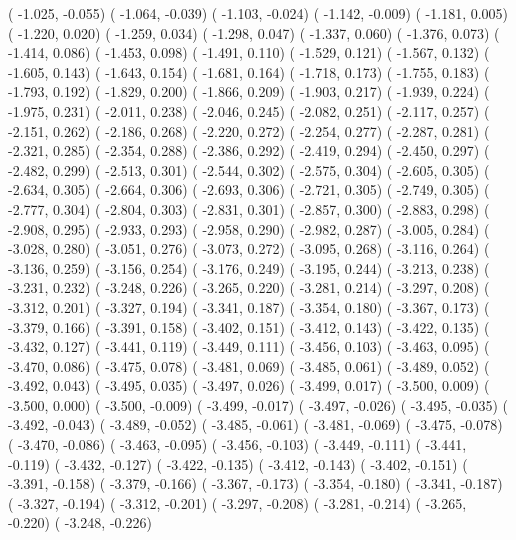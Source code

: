 {  ( -1.025,  -0.055)  ( -1.064,  -0.039)  ( -1.103,  -0.024)  ( -1.142,  -0.009)  ( -1.181,   0.005)
  ( -1.220,   0.020)  ( -1.259,   0.034)  ( -1.298,   0.047)  ( -1.337,   0.060)  ( -1.376,   0.073)
  ( -1.414,   0.086)  ( -1.453,   0.098)  ( -1.491,   0.110)  ( -1.529,   0.121)  ( -1.567,   0.132)
  ( -1.605,   0.143)  ( -1.643,   0.154)  ( -1.681,   0.164)  ( -1.718,   0.173)  ( -1.755,   0.183)
  ( -1.793,   0.192)  ( -1.829,   0.200)  ( -1.866,   0.209)  ( -1.903,   0.217)  ( -1.939,   0.224)
  ( -1.975,   0.231)  ( -2.011,   0.238)  ( -2.046,   0.245)  ( -2.082,   0.251)  ( -2.117,   0.257)
  ( -2.151,   0.262)  ( -2.186,   0.268)  ( -2.220,   0.272)  ( -2.254,   0.277)  ( -2.287,   0.281)
  ( -2.321,   0.285)  ( -2.354,   0.288)  ( -2.386,   0.292)  ( -2.419,   0.294)  ( -2.450,   0.297)
  ( -2.482,   0.299)  ( -2.513,   0.301)  ( -2.544,   0.302)  ( -2.575,   0.304)  ( -2.605,   0.305)
  ( -2.634,   0.305)  ( -2.664,   0.306)  ( -2.693,   0.306)  ( -2.721,   0.305)  ( -2.749,   0.305)
  ( -2.777,   0.304)  ( -2.804,   0.303)  ( -2.831,   0.301)  ( -2.857,   0.300)  ( -2.883,   0.298)
  ( -2.908,   0.295)  ( -2.933,   0.293)  ( -2.958,   0.290)  ( -2.982,   0.287)  ( -3.005,   0.284)
  ( -3.028,   0.280)  ( -3.051,   0.276)  ( -3.073,   0.272)  ( -3.095,   0.268)  ( -3.116,   0.264)
  ( -3.136,   0.259)  ( -3.156,   0.254)  ( -3.176,   0.249)  ( -3.195,   0.244)  ( -3.213,   0.238)
  ( -3.231,   0.232)  ( -3.248,   0.226)  ( -3.265,   0.220)  ( -3.281,   0.214)  ( -3.297,   0.208)
  ( -3.312,   0.201)  ( -3.327,   0.194)  ( -3.341,   0.187)  ( -3.354,   0.180)  ( -3.367,   0.173)
  ( -3.379,   0.166)  ( -3.391,   0.158)  ( -3.402,   0.151)  ( -3.412,   0.143)  ( -3.422,   0.135)
  ( -3.432,   0.127)  ( -3.441,   0.119)  ( -3.449,   0.111)  ( -3.456,   0.103)  ( -3.463,   0.095)
  ( -3.470,   0.086)  ( -3.475,   0.078)  ( -3.481,   0.069)  ( -3.485,   0.061)  ( -3.489,   0.052)
  ( -3.492,   0.043)  ( -3.495,   0.035)  ( -3.497,   0.026)  ( -3.499,   0.017)  ( -3.500,   0.009)
  ( -3.500,   0.000)  ( -3.500,  -0.009)  ( -3.499,  -0.017)  ( -3.497,  -0.026)  ( -3.495,  -0.035)
  ( -3.492,  -0.043)  ( -3.489,  -0.052)  ( -3.485,  -0.061)  ( -3.481,  -0.069)  ( -3.475,  -0.078)
  ( -3.470,  -0.086)  ( -3.463,  -0.095)  ( -3.456,  -0.103)  ( -3.449,  -0.111)  ( -3.441,  -0.119)
  ( -3.432,  -0.127)  ( -3.422,  -0.135)  ( -3.412,  -0.143)  ( -3.402,  -0.151)  ( -3.391,  -0.158)
  ( -3.379,  -0.166)  ( -3.367,  -0.173)  ( -3.354,  -0.180)  ( -3.341,  -0.187)  ( -3.327,  -0.194)
  ( -3.312,  -0.201)  ( -3.297,  -0.208)  ( -3.281,  -0.214)  ( -3.265,  -0.220)  ( -3.248,  -0.226)
}
